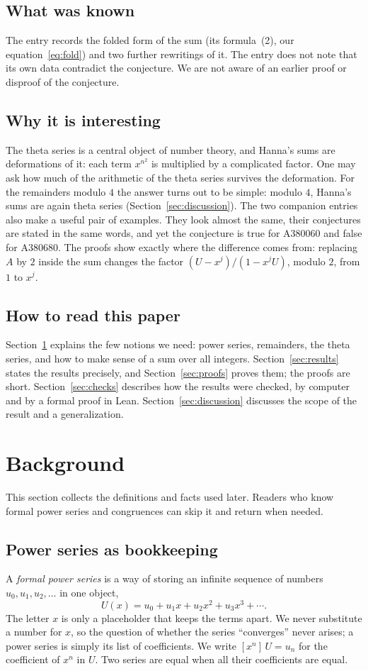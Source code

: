 \documentclass[11pt,a4paper]{article}
\theoremstyle{definition}
\theoremstyle{remark}
\newcommand{\coeff}[2]{[x^{#1}]\,#2}
\begin{document}
\subsection{What was known}
The entry records the folded form of the sum (its formula~(2), our equation~\eqref{eq:fold}) and two further
rewritings of it. The entry does not note that its own data contradict the conjecture. We are not aware of an earlier proof or disproof of the conjecture.

\subsection{Why it is interesting}
The theta series is a central object of number theory, and Hanna's sums are deformations of it: each term
$x^{n^2}$ is multiplied by a complicated factor. One may ask how much of the arithmetic of the theta series survives
the deformation. For the remainders modulo $4$ the answer turns out to be simple: modulo $4$, Hanna's sums are again
theta series (Section~\ref{sec:discussion}).
The two companion entries also make a useful pair of examples. They look almost the same, their conjectures are
stated in the same words, and yet the conjecture is true for A380060 and false for A380680. The proofs show exactly where the
difference comes from: replacing $A$ by $2$ inside the sum changes the factor $(U-x^j)/(1-x^jU)$, modulo $2$, from $1$
to $x^j$.

\subsection{How to read this paper}
Section~\ref{sec:background} explains the few notions we need: power series, remainders, the theta series, and how to
make sense of a sum over all integers. Section~\ref{sec:results} states the results precisely, and
Section~\ref{sec:proofs} proves them; the proofs are short. Section~\ref{sec:checks} describes how the results were
checked, by computer and by a formal proof in Lean. Section~\ref{sec:discussion} discusses the scope of the result
and a generalization.
\section{Background}\label{sec:background}
This section collects the definitions and facts used later. Readers who know formal power series and congruences can skip it and return when needed.
\subsection{Power series as bookkeeping}
A \emph{formal power series} is a way of storing an infinite sequence of numbers $u_0,u_1,u_2,\dots$ in one object,
\[
U(x)=u_0+u_1x+u_2x^2+u_3x^3+\cdots .
\]
The letter $x$ is only a placeholder that keeps the terms apart. We never substitute a number for $x$, so the question
of whether the series ``converges'' never arises; a power series is simply its list of coefficients. We write
$\coeff{n}{U}=u_n$ for the coefficient of $x^n$ in $U$. Two series are equal when all their coefficients are equal.
\end{document}
